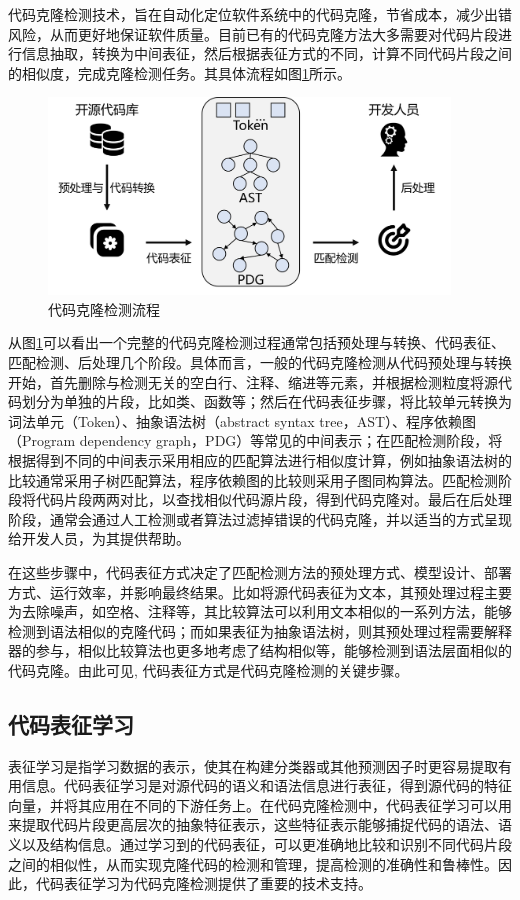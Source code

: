 代码克隆检测技术，旨在自动化定位软件系统中的代码克隆，节省成本，减少出错风险，从而更好地保证软件质量。目前已有的代码克隆方法大多需要对代码片段进行信息抽取，转换为中间表征，然后根据表征方式的不同，计算不同代码片段之间的相似度，完成克隆检测任务\cite{9321538}。其具体流程如图\ref{fig:figure1}所示。
\begin{figure}[H]
    \centering
    \includegraphics[width=0.95\textwidth]{figures/figure1}
    \caption{代码克隆检测流程}\label{fig:figure1}
\end{figure}

从图\ref{fig:figure1}可以看出一个完整的代码克隆检测过程通常包括预处理与转换、代码表征、匹配检测、后处理几个阶段。具体而言，一般的代码克隆检测从代码预处理与转换开始，首先删除与检测无关的空白行、注释、缩进等元素，并根据检测粒度将源代码划分为单独的片段，比如类、函数等；然后在代码表征步骤，将比较单元转换为词法单元（Token）、抽象语法树（abstract syntax tree，AST）、程序依赖图（Program dependency graph，PDG）等常见的中间表示；在匹配检测阶段，将根据得到不同的中间表示采用相应的匹配算法进行相似度计算，例如抽象语法树的比较通常采用子树匹配算法，程序依赖图的比较则采用子图同构算法。匹配检测阶段将代码片段两两对比，以查找相似代码源片段，得到代码克隆对。最后在后处理阶段，通常会通过人工检测或者算法过滤掉错误的代码克隆，并以适当的方式呈现给开发人员，为其提供帮助。

在这些步骤中，代码表征方式决定了匹配检测方法的预处理方式、模型设计、部署方式、运行效率，并影响最终结果\cite{陈秋远2019代码克隆检测研究进展}。比如将源代码表征为文本，其预处理过程主要为去除噪声，如空格、注释等，其比较算法可以利用文本相似的一系列方法，能够检测到语法相似的克隆代码；而如果表征为抽象语法树，则其预处理过程需要解释器的参与，相似比较算法也更多地考虑了结构相似等，能够检测到语法层面相似的代码克隆。由此可见, 代码表征方式是代码克隆检测的关键步骤。


\subsection{代码表征学习}
\label{subsec:Code representation}
表征学习是指学习数据的表示，使其在构建分类器或其他预测因子时更容易提取有用信息\cite{Bengio2013Representation}。代码表征学习是对源代码的语义和语法信息进行表征，得到源代码的特征向量，并将其应用在不同的下游任务上。在代码克隆检测中，代码表征学习可以用来提取代码片段更高层次的抽象特征表示，这些特征表示能够捕捉代码的语法、语义以及结构信息\cite{liu2023contrabert}。通过学习到的代码表征，可以更准确地比较和识别不同代码片段之间的相似性，从而实现克隆代码的检测和管理，提高检测的准确性和鲁棒性。因此，代码表征学习为代码克隆检测提供了重要的技术支持。

